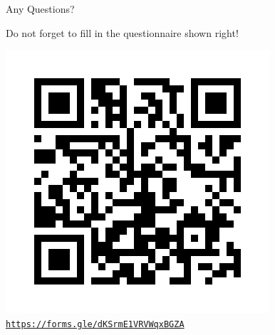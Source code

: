 \documentclass[aspectratio=169, 12pt]{beamer}
\newcommand{\ohref}[1]{\href{#1}{\texttt{#1}}}
\begin{document}
	\begin{frame}{Any Questions?}
		\begin{minipage}{0.35\textwidth}
			\raggedright
			Do not forget to fill in the questionnaire shown right!
		\end{minipage}\hfill
		\begin{minipage}{0.58\textwidth}
			\vspace{0pt}
			\raggedleft
			\includegraphics[scale=0.4]{../../assets/post_lesson_assessment.png}
			\centering
			\ohref{https://forms.gle/dKSrmE1VRVWqxBGZA}
		\end{minipage}
	\end{frame}
	
\end{document}
